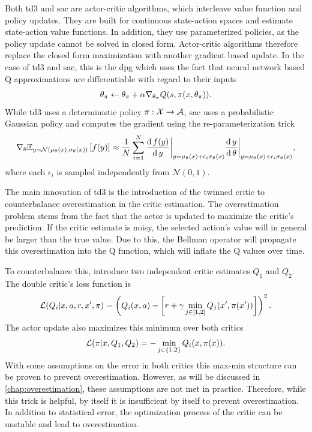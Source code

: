 Both \ac{td3} and \ac{sac} are actor-critic algorithms, which interleave value function and policy updates.
They are built for continuous state-action spaces and estimate state-action value functions.
In addition, they use parameterized policies, as the policy update cannot be solved in closed form.
Actor-critic algorithms therefore replace the closed form maximization with another gradient based update.
In the case of \ac{td3} and \ac{sac}, this is the \ac{dpg} \parencite{silver2014deterministic} which uses the fact that neural network based Q approximations are differentiable with regard to their inputs
\begin{align}
    \theta_\pi \leftarrow \theta_\pi + \alpha \nabla_{\theta_\pi} Q(s, \pi(x, \theta_\pi)).
\end{align}
While \ac{td3} uses a deterministic policy $\pi: \mathcal{X} \rightarrow \mathcal{A}$, \ac{sac} uses a probabilistic Gaussian policy and computes the gradient using the re-parameterization trick
\begin{align}
    \nabla_{\theta} \mathbb{E}_{y \sim \mathcal{N}(\mu_\theta(x), \sigma_\theta(x))}\left[  f(y) \right] \approx \frac{1}{N} \sum_{i=1}^{N} \frac{\mathrm{d}\,f(y)}{\mathrm{d}\, y}\bigg|_{y = \mu_\theta(x) + \epsilon_i \sigma_\theta(x)}  \frac{\mathrm{d}\,y}{\mathrm{d}\,\theta}\bigg|_{y = \mu_\theta(x) + \epsilon_i \sigma_\theta(x)},
\end{align}
where each $\epsilon_i$ is sampled independently from $\mathcal{N}(0,1)$.

The main innovation of \ac{td3} is the introduction of the twinned critic to counterbalance overestimation in the critic estimation.
The overestimation problem stems from the fact that the actor is updated to maximize the critic's prediction.
If the critic estimate is noisy, the selected action's value will in general be larger than the true value.
Due to this, the Bellman operator will propagate this overestimation into the Q function, which will inflate the Q values over time.

To counterbalance this, \textcite{fujimoto2018addressing} introduce two independent critic estimates $Q_1$ and $Q_2$.
The double critic's loss function is
\begin{align}
    \mathcal{L}(Q_i| x, a, r, x', \pi) = \left(Q_i(x,a) - \left[r + \gamma \min_{j \in [1,2]}Q_j(x', \pi(x'))\right]\right)^2.
\end{align}
The actor update also maximizes this minimum over both critics
\begin{align}
    \mathcal{L}(\pi| x, Q_1, Q_2) = - \min_{j \in \{1,2\}} Q_i(x, \pi(x)).
\end{align}
With some assumptions on the error in both critics this max-min structure can be proven to prevent overestimation.
However, as will be discussed in \autoref{chap:overestimation}, these assumptions are not met in practice.
Therefore, while this trick is helpful, by itself it is insufficient by itself to prevent overestimation.
In addition to statistical error, the optimization process of the critic can be unstable and lead to overestimation.

